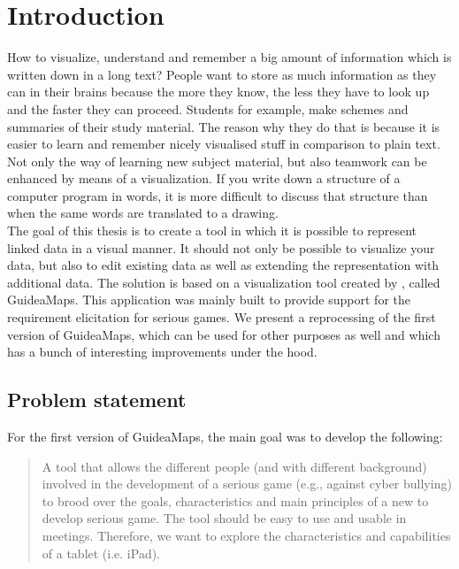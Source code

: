 \chapter{Introduction}\label{ch:introduction}

How to visualize, understand and remember a big amount of information which is written down in a long text? People want to store as much information as they can in their brains because the more they know, the less they have to look up and the faster they can proceed. Students for example, make schemes and summaries of their study material. The reason why they do that is because it is easier to learn and remember nicely visualised stuff in comparison to plain text.
Not only the way of learning new subject material, but also teamwork can be enhanced by means of a visualization. If you write down a structure of a computer program in words, it is more difficult to discuss that structure than when the same words are translated to a drawing.\\

The goal of this thesis is to create a tool in which it is possible to represent linked data in a visual manner. It should not only be possible to visualize your data, but also to edit existing data as well as extending the representation with additional data. The solution is based on a visualization tool created by \cite{erikjanssens}, called GuideaMaps. This application was mainly built to provide support for the requirement elicitation for serious games. We present a reprocessing of the first version of GuideaMaps, which can be used for other purposes as well and which has a bunch of interesting improvements under the hood.

\section{Problem statement}\label{sec:problem-statement}
For the first version of GuideaMaps, the main goal was to develop the following:

\begin{quote}
A tool that allows the different people (and with different background) involved in the development of a serious game (e.g., against cyber bullying) to brood over the goals, characteristics and main principles of a new to develop serious game. The tool should be easy to use and usable in meetings. Therefore, we want to explore the characteristics and capabilities of a tablet (i.e. iPad). \hfill \citep{erikjanssens}
\end{quote}

